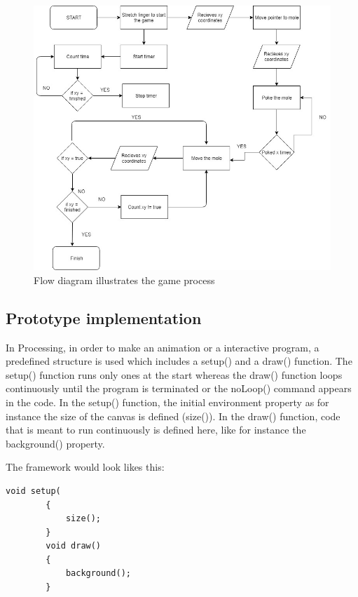 \begin{figure}[h]
    \centering
    \includegraphics[width=.8\textwidth]{figures/FlowDiagram.jpg}
    \caption[Flow diagram: game design]{Flow diagram illustrates the game process}
    \label{fig: flowdiagram}
\end{figure}


\subsection{Prototype implementation}

In Processing, in order to make an animation or a interactive program, a predefined structure is used which includes a setup() and a draw() function. The setup() function runs only ones at the start whereas the draw() function loops continuously until the program is terminated or the noLoop() command appears in the code.
In the setup() function, the initial environment property as for instance the size of the canvas is defined  (size()). In the draw() function, code that is meant to run continuously is defined here, like for instance the background() property. 

The framework would look likes this:
\lstset{frameround=tttt}
\lstset{frame=single}
\lstset{xleftmargin=.05\textwidth, xrightmargin=.05\textwidth}
\lstset{language=Java}
\begin{lstlisting}[caption = {Processing framework}, label={lst:Java}]
        void setup(
        {
            size();
        }
        void draw()
        {
            background();
        }

\end{lstlisting}

